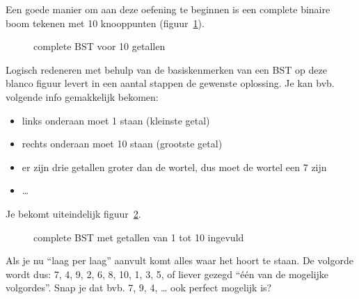\begin{Oplossing}{4.10}
Een goede manier om aan deze oefening te beginnen is een complete binaire boom tekenen met 10 knooppunten (figuur~\ref{fig:herhoefBST2Stap1}).
\begin{figure}[htbp]
    \centering
{}
\caption{complete BST voor 10 getallen}
    \label{fig:herhoefBST2Stap1}
\end{figure}
Logisch redeneren met behulp van de basiskenmerken van een BST op deze blanco figuur levert in een aantal stappen de gewenste oplossing. Je kan bvb. volgende info gemakkelijk bekomen:
\begin{itemize}
\item links onderaan moet 1 staan (kleinste getal)
\item rechts onderaan moet 10 staan (grootste getal)
\item er zijn drie getallen groter dan de wortel, dus moet de wortel een 7 zijn
\item …
\end{itemize}
Je bekomt uiteindelijk figuur~\ref{fig:herhoefBST2Stap2}.
\begin{figure}[htbp]
    \centering
{}
\caption{complete BST met getallen van 1 tot 10 ingevuld}
    \label{fig:herhoefBST2Stap2}
\end{figure}
Als je nu “laag per laag” aanvult komt alles waar het hoort te staan. De volgorde wordt dus: 7, 4, 9, 2, 6, 8, 10, 1, 3, 5, of liever gezegd “één van de mogelijke volgordes”. Snap je dat bvb. 7, 9, 4, … ook perfect mogelijk is?

\end{Oplossing}
